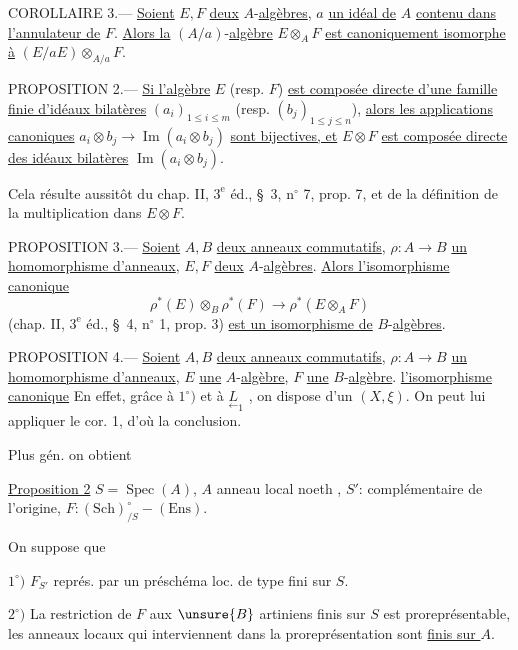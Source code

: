 COROLLAIRE 3.--- \uline{Soient} $E,F$ \uline{deux} $A$-\uline{algèbres}, $a$ \uline{un idéal de} $A$ \uline{contenu dans l'annulateur de} $F$. \uline{Alors la} $(A/a)$-\uline{algèbre} $E\otimes_A F$ \uline{est canoniquement isomorphe à} $(E/aE)\otimes_{A/a}F$.

PROPOSITION 2.--- \uline{Si l'algèbre} $E$ (resp. $F$) \uline{est composée directe d'une famille finie d'idéaux bilatères} $(a_i)_{1\le i\le m}$ (resp. $(b_j)_{1\le j\le n}$), \uline{alors les applications canoniques} $a_i\otimes b_j\to\operatorname{Im}(a_i\otimes b_j)$ \uline{sont bijectives, et} $E\otimes F$ \uline{est composée directe des idéaux bilatères} $\operatorname{Im}(a_i\otimes b_j)$.

Cela résulte aussitôt du chap. II, $3^{\mathrm e}$ éd., \S\ 3, n$^\circ$ 7, prop. 7, et de la définition de la multiplication dans $E\otimes F$.

PROPOSITION 3.--- \uline{Soient} $A,B$ \uline{deux anneaux commutatifs}, $\rho:A\to B$ \uline{un homomorphisme d'anneaux}, $E,F$ \uline{deux} $A$-\uline{algèbres}. \uline{Alors l'isomorphisme canonique}
\[
\rho^*(E)\otimes_B\rho^*(F)\longrightarrow\rho^*(E\otimes_A F)
\]
(chap. II, $3^{\mathrm e}$ éd., \S\ 4, n$^\circ$ 1, prop. 3) \uline{est un isomorphisme de} $B$-\uline{algèbres}.

PROPOSITION 4.--- \uline{Soient} $A,B$ \uline{deux anneaux commutatifs}, $\rho:A\to B$ \uline{un homomorphisme d'anneaux}, $E$ \uline{une} $A$-\uline{algèbre}, $F$ \uline{une} $B$-\uline{algèbre}. \uline{ l'isomorphisme canonique}
En effet, grâce à $1^\circ)$ et à $\underset{\leftarrow}{L}_1$ , on dispose d'un $(X,\xi)$. On peut lui appliquer le cor. 1, d'où la conclusion.

Plus gén. on obtient

\uline{Proposition 2} $S=\operatorname{Spec}(A)$, $A$ anneau local noeth , $S'$: complémentaire de l'origine,  $F:(\mathrm{Sch})_{/S}^{\circ}\mathbin{-}(\mathrm{Ens})$.

On suppose que

$1^\circ)$ $F_{S'}$ représ. par un  préschéma  loc. de type fini sur $S$.

$2^\circ)$ La restriction de $F$ aux $\unsure{B}$ artiniens finis sur $S$ est proreprésentable, les anneaux locaux qui interviennent dans la proreprésentation sont   \uline{finis sur $A$}.

